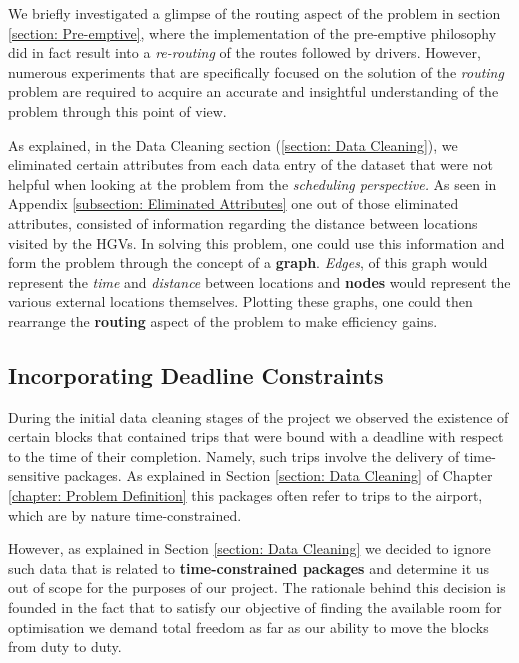\vspace{\baselineskip}
\noindent
We briefly investigated a glimpse of the routing aspect of the problem in section \ref{section: Pre-emptive}, where the implementation of the pre-emptive philosophy did in fact result into a \textit{re-routing} of the routes followed by drivers. However, numerous experiments that are specifically focused on the solution of the \textit{routing} problem are required to acquire an accurate and insightful understanding of the problem through this point of view.

\vspace{\baselineskip}
\noindent
 As explained, in the Data Cleaning section (\ref{section: Data Cleaning}), we eliminated certain attributes from each data entry of the dataset that were not helpful when looking at the problem from the \textit{scheduling perspective.} As seen in Appendix \ref{subsection: Eliminated Attributes} one out of those eliminated attributes, consisted of information regarding the distance between locations visited by the HGVs. In solving this problem, one could use this information and form the problem through the concept of a \textbf{graph}. \textit{Edges}, of this graph would represent the \textit{time} and \textit{distance} between locations and \textbf{nodes} would represent the various external locations themselves. Plotting these graphs, one could then rearrange the \textbf{routing} aspect of the problem to make efficiency gains.
 
\subsection*{Incorporating Deadline Constraints}
During the initial data cleaning stages of the project we observed the existence of certain blocks that contained trips that were bound with a deadline with respect to the time of their completion. Namely, such trips involve the delivery of time-sensitive packages. As explained in Section \ref{section: Data Cleaning} of Chapter \ref{chapter: Problem Definition} this packages often refer to trips to the airport, which are by nature time-constrained.

\vspace{\baselineskip}
\noindent
However, as explained in Section \ref{section: Data Cleaning} we decided to ignore such data that is related to \textbf{time-constrained packages} and determine it us out of scope for the purposes of our project. The rationale behind this decision is founded in the fact that to satisfy our objective of finding the available room for optimisation we demand total freedom as far as our ability to move the blocks from duty to duty.


